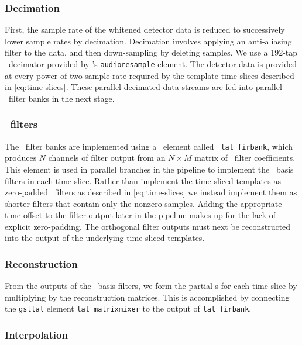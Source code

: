 \subsubsection{Decimation}

First, the sample rate of the whitened detector data is reduced to successively
lower sample rates by decimation.  Decimation involves applying an anti-aliasing
filter to the data, and then down-sampling by deleting samples.  We use a
192-tap \fir\ decimator provided by \gstreamer{}'s {\tt audioresample}
element.  The detector data is provided at every power-of-two sample rate
required by the template time slices described in \eqref{eq:time-slices}.  These
parallel decimated data streams are fed into parallel \fir\ filter banks in the
next stage.

\subsubsection{\fir\ filters}

The \fir\ filter banks are implemented using a \gstlal\ element called {\tt
lal\_firbank}, which produces $N$ channels of filter output from an $N\times M$ matrix of
\fir\ filter coefficients.  This element is used in parallel branches in the
pipeline to implement the \SVD\ basis filters in each time
slice.  Rather than implement the time-sliced templates as zero-padded \fir\
filters as described in \eqref{eq:time-slices} we instead implement them as shorter
filters that contain only the nonzero samples.  Adding the appropriate time
offset to the filter output later in the pipeline makes up for the lack of
explicit zero-padding.  The orthogonal filter outputs must next be reconstructed
into the output of the underlying time-sliced templates. 

\subsubsection{Reconstruction}

From the outputs of the \SVD\ basis filters, we form the partial \SNR{}s for each time 
slice by multiplying by the reconstruction matrices.  This is accomplished by connecting 
the \texttt{gstlal} element \texttt{lal\_matrixmixer} to the output of
\texttt{lal\_firbank}.

\subsubsection{Interpolation}

